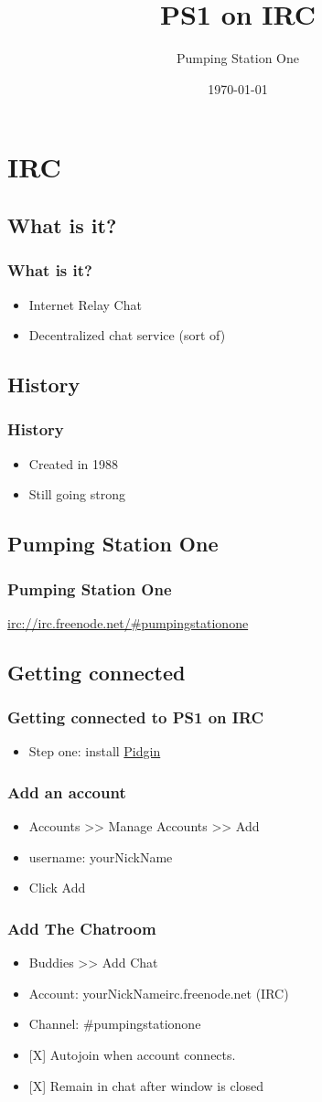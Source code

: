 \documentclass[hyperref={pdfpagelabels=false}]{beamer}
\title{PS1 on IRC}
\author{Pumping Station One}
\date{\today}
\begin{document}
\frame{\titlepage}
\section[Outline]{}
\frame{\tableofcontents}
\section{IRC}
	\subsection{What is it?}
		\frame
		{
			\frametitle{What is it?}
			\begin{itemize}
				\item{Internet Relay Chat}
				\item{Decentralized chat service (sort of)}
			\end{itemize}
		}

	\subsection{History}
		\frame
		{
			\frametitle{History}
			\begin{itemize}
				\item{Created in 1988}
				\item{Still going strong}
			\end{itemize}
		}
	\subsection{Pumping Station One}
		\frame
		{
			\frametitle{Pumping Station One}
			\url{irc://irc.freenode.net/\#pumpingstationone}
		}
	\subsection{Getting connected}
		\frame
		{
			\frametitle{Getting connected to PS1 on IRC}
			\begin{itemize}
				\item{Step one: install \href{http://pidgin.im}{Pidgin}}
			\end{itemize}
		}
		\frame
		{
			\frametitle{Add an account}
			\begin{itemize}
				\item{Accounts >> Manage Accounts >> Add}
				\item{username: yourNickName}
				\item{Click Add}
			\end{itemize}
		}
		\frame
		{
			\frametitle{Add The Chatroom}
			\begin{itemize}
				\item{Buddies >> Add Chat}
				\item{Account: yourNickName\makeatletter@\makeatother irc.freenode.net (IRC)}
				\item{Channel: \#pumpingstationone}
				\item{[X] Autojoin when account connects.}
				\item{[X] Remain in chat after window is closed}
			\end{itemize}
		}
\end{document}
